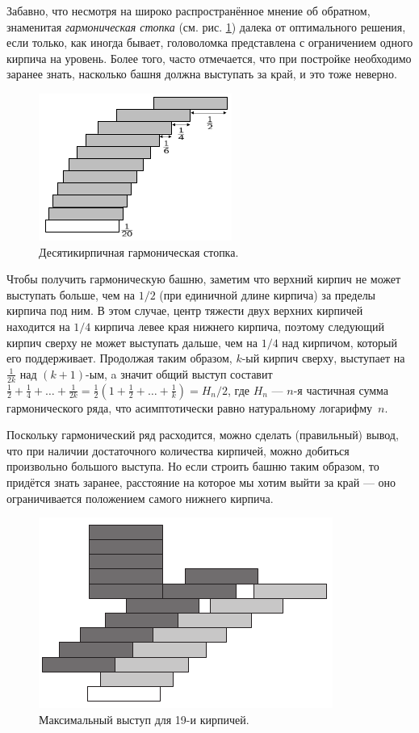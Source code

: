 Забавно, что несмотря на широко распространённое мнение об обратном, знаменитая \emph{гармоническая стопка} (см. рис. \ref{pic:kirpich1}) далека от оптимального решения, если только, как иногда бывает, головоломка представлена с ограничением одного кирпича на уровень.
Более того, часто отмечается, что при постройке необходимо заранее знать, насколько башня должна выступать за край, и это тоже неверно.

\begin{figure}[ht!]
\centering
\includegraphics[scale=1]{pics/kirpich1}
\caption{Десятикирпичная гармоническая стопка.}
\label{pic:kirpich1}
\end{figure}

Чтобы получить гармоническую башню, заметим что верхний кирпич не может выступать больше, чем на $1/2$ (при единичной длине кирпича) за пределы кирпича под ним.
В этом случае, центр тяжести двух верхних кирпичей находится на $1/4$ кирпича левее края нижнего кирпича, поэтому следующий кирпич сверху не может выступать дальше, чем на $1/4$ над кирпичом, который его поддерживает.
Продолжая таким образом, $k$-ый кирпич сверху, выступает на $\tfrac1{2k}$ над $(k + 1)$-ым, a значит общий выступ составит $\tfrac12+\tfrac14+\dots+\tfrac1{2k}=\tfrac12(1+\tfrac12+\dots+\tfrac1k)=H_n/2$, где $H_n$ --- $n$-я частичная сумма гармонического ряда, что асимптотически равно натуральному логарифму~$n$.

Поскольку гармонический ряд расходится, можно сделать (правильный) вывод, что при наличии достаточного количества кирпичей, можно добиться произвольно большого выступа.
Но если строить башню таким образом, то придётся знать заранее, расстояние на которое мы хотим выйти за край --- оно ограничивается положением самого нижнего кирпича.

\begin{figure}[htb!]
\centering
\includegraphics[scale=1]{pics/kirpich2}
\caption{Максимальный выступ для 19-и кирпичей.}
\label{pic:kirpich2}
\end{figure}

